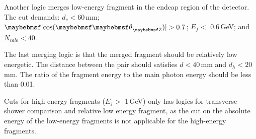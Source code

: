 Another logic merges low-energy fragment in the  endcap region of the detector. The cut demands: $d_c < 60$\,mm; $\absCosTheta > 0.7$; $E_f<$ 0.6\,GeV; and $N_{calo}<40$.


The last merging logic is that the merged fragment should be relatively low energetic. The distance between the pair should satisfies $d < 40$\,mm and $d_h < 20$\,mm. The ratio of the fragment energy  to the main photon energy should be less than 0.01.







Cuts for high-energy fragments ($E_f>$ 1\,GeV) only has logics for transverse shower comparison and relative low energy fragment, as the cut on the absolute energy of the low-energy fragments is not applicable for the  high-energy fragments.



